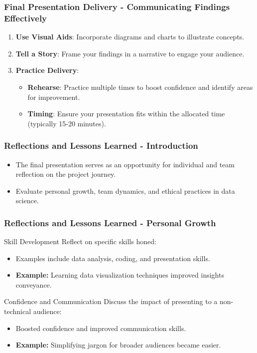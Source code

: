 \documentclass[aspectratio=169]{beamer}
\begin{document}
\begin{frame}[fragile]
    \frametitle{Final Presentation Delivery - Communicating Findings Effectively}
    \begin{enumerate}
        \item \textbf{Use Visual Aids}: Incorporate diagrams and charts to illustrate concepts.
        \item \textbf{Tell a Story}: Frame your findings in a narrative to engage your audience.
        \item \textbf{Practice Delivery}:
            \begin{itemize}
                \item \textbf{Rehearse}: Practice multiple times to boost confidence and identify areas for improvement.
                \item \textbf{Timing}: Ensure your presentation fits within the allocated time (typically 15-20 minutes).
            \end{itemize}
    \end{enumerate}
\end{frame}

\begin{frame}[fragile]
  \frametitle{Reflections and Lessons Learned - Introduction}
  \begin{itemize}
    \item The final presentation serves as an opportunity for individual and team reflection on the project journey.
    \item Evaluate personal growth, team dynamics, and ethical practices in data science.
  \end{itemize}
\end{frame}

\begin{frame}[fragile]
  \frametitle{Reflections and Lessons Learned - Personal Growth}
  \begin{block}{Skill Development}
    Reflect on specific skills honed:
    \begin{itemize}
      \item Examples include data analysis, coding, and presentation skills.
      \item \textbf{Example:} Learning data visualization techniques improved insights conveyance.
    \end{itemize}
  \end{block}
  
  \begin{block}{Confidence and Communication}
    Discuss the impact of presenting to a non-technical audience:
    \begin{itemize}
      \item Boosted confidence and improved communication skills.
      \item \textbf{Example:} Simplifying jargon for broader audiences became easier.
    \end{itemize}
  \end{block}
\end{frame}
\end{document}
